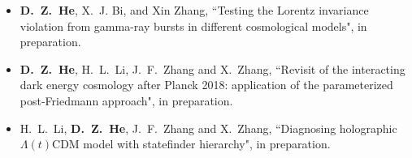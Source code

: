   \begin{itemize}[leftmargin=*]
    \item \textbf{D.~Z.~He}, X.~J. Bi, and Xin Zhang, ``Testing the Lorentz invariance violation from gamma-ray bursts in different cosmological models", in preparation.
      
    \item \textbf{D.~Z.~He}, H.~L.~Li, J.~F.~Zhang and X.~Zhang, ``Revisit of the interacting dark energy cosmology after Planck 2018: application of the parameterized post-Friedmann approach", in preparation.  

    
    \item H.~L.~Li, \textbf{D.~Z.~He}, J.~F.~Zhang and X.~Zhang, ``Diagnosing holographic $\Lambda(t)$CDM model with statefinder hierarchy", in preparation.

    \end{itemize}